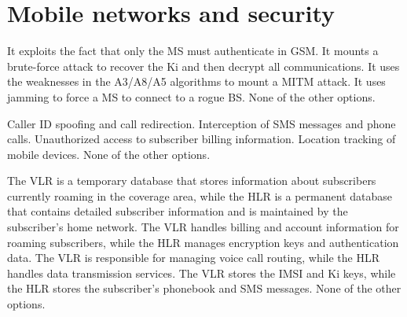 \section{Mobile networks and security}

\begin{checkboxes}
    \CorrectChoice It exploits the fact that only the MS must authenticate in GSM.
    \choice It mounts a brute-force attack to recover the Ki and then decrypt all communications.
    \choice It uses the weaknesses in the A3/A8/A5 algorithms to mount a MITM attack.
    \choice It uses jamming to force a MS to connect to a rogue BS.
    \choice None of the other options.
\end{checkboxes}


\begin{checkboxes}
    \CorrectChoice Caller ID spoofing and call redirection.
    \CorrectChoice Interception of SMS messages and phone calls.
    \choice Unauthorized access to subscriber billing information.
    \choice Location tracking of mobile devices.
    \choice None of the other options.
\end{checkboxes}


\begin{checkboxes}
    \CorrectChoice The VLR is a temporary database that stores information about subscribers currently roaming in the coverage area, while the HLR is a permanent database that contains detailed subscriber information and is maintained by the subscriber's home network.
    \choice The VLR handles billing and account information for roaming subscribers, while the HLR manages encryption keys and authentication data.
    \choice The VLR is responsible for managing voice call routing, while the HLR handles data transmission services.
    \choice The VLR stores the IMSI and Ki keys, while the HLR stores the subscriber's phonebook and SMS messages.
    \choice None of the other options.
\end{checkboxes}


